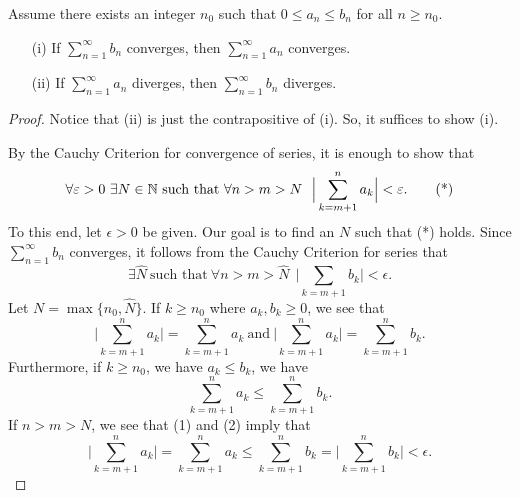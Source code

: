 \documentclass[a4paper]{article}
\begin{document}
\begin{theorem}
    Assume there exists an integer \( {n}_{0}  \) such that \( 0 \leq {a}_{n} \leq {b}_{n} \) for all \( n \geq {n}_{0} \). 
    \begin{enumerate}
        \item[(i)] If \( \sum_{ n=1  }^{ \infty  } {b}_{n} \) converges, then \( \sum_{ n=1  }^{ \infty  } {a}_{n} \) converges.
        \item[(ii)] If \( \sum_{ n=1  }^{ \infty  } {a}_{n} \) diverges, then \( \sum_{ n=1  }^{ \infty  } {b}_{n} \) diverges.
    \end{enumerate}
\end{theorem}
\begin{proof}
Notice that (ii) is just the contrapositive of (i). So, it suffices to show (i).

By the Cauchy Criterion for convergence of series, it is enough to show that 
\[  \forall \varepsilon > 0 \ \exists N \in \mathbb{N} \ \text{such that} \ \forall n > m > N \ \ \Big| \sum_{ k=m+1 }^{ n } {a}_{k} \Big|  < \varepsilon. \tag{*} \]
To this end, let \( \epsilon > 0  \) be given. Our goal is to find an \( N  \) such that (*) holds. Since \( \sum_{ n=1  }^{ \infty  } {b}_{n} \) converges, it follows from the Cauchy Criterion for series that 
\[  \exists \hat{N} \ \text{such that} \ \forall n > m > \hat{N} \ \ \Big|  \sum_{ k= m +1 }^{  } {b}_{k} \Big|  < \epsilon. \]
Let \(N = \max \{ {n}_{0}, \hat{N} \}  \). If \( k \geq {n}_{0}  \) where \( {a}_{k }, {b}_{k} \geq 0  \), we see that 
\[  \Big|  \sum_{ k=m+1 }^{ n } {a}_{k } \Big| = \sum_{ k=m+1  }^{ n } {a}_{k} \ \text{and} \ \Big| \sum_{ k=m+1 }^{ n } {a}_{k} \Big|  = \sum_{ k=m+1 }^{ n } {b}_{k}. \tag{1} \]
Furthermore, if \( k \geq {n}_{0} \), we have \( {a}_{k } \leq {b}_{k} \), we have
\[  \sum_{ k=m+1 }^{ n } {a}_{k} \leq \sum_{ k=m+1 }^{ n } {b}_{k}. \tag{2} \]
If \( n > m > N \), we see that (1) and (2) imply that  
\[  \Big| \sum_{ k=m+1 }^{ n  } {a}_{k} \Big|  = \sum_{ k= m+1 }^{ n } {a}_{k} \leq \sum_{ k= m +1 }^{ n  } {b}_{k} = \Big|  \sum_{ k=m+1 }^{ n } {b}_{k} \Big|  < \epsilon. \]


\end{proof}
\end{document}
